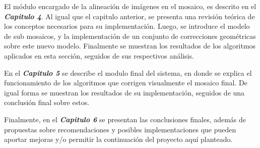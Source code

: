 El módulo encargado de la alineación de imágenes en el mosaico, es descrito en el \textit{\textbf{Capitulo 4}}. Al igual que el capitulo anterior, se presenta una revisión teórica de los conceptos necesarios para su implementación. Luego, se introduce el modelo de sub mosaicos, y la implementación de un conjunto de correcciones geométricas sobre este nuevo modelo. Finalmente se muestran los resultados de los algoritmos aplicados en esta sección, seguidos de sus respectivos análisis.

En el \textit{\textbf{Capitulo 5}} se describe el modulo final del sistema, en donde se explica el funcionamiento de los algoritmos que corrigen visualmente el mosaico final. De igual forma se muestran los resultados de su implementación, seguidos de una conclusión final sobre estos.

Finalmente, en el \textit{\textbf{Capitulo 6}} se presentan las conclusiones finales, además de propuestas sobre recomendaciones y posibles implementaciones que pueden aportar mejoras y/o permitir la continuación del proyecto aquí planteado.